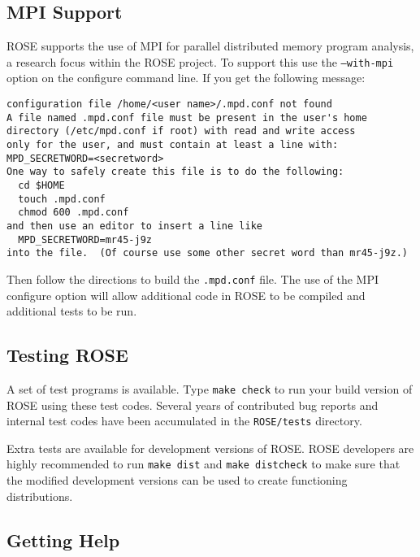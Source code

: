 
\subsection{MPI Support}
     ROSE supports the use of MPI for parallel distributed memory program analysis, a
research focus within the ROSE project.  To support this use the {\tt --with-mpi}
option on the configure command line.  If you get the following message:
\begin{verbatim}
configuration file /home/<user name>/.mpd.conf not found
A file named .mpd.conf file must be present in the user's home
directory (/etc/mpd.conf if root) with read and write access
only for the user, and must contain at least a line with:
MPD_SECRETWORD=<secretword>
One way to safely create this file is to do the following:
  cd $HOME
  touch .mpd.conf
  chmod 600 .mpd.conf
and then use an editor to insert a line like
  MPD_SECRETWORD=mr45-j9z
into the file.  (Of course use some other secret word than mr45-j9z.)
\end{verbatim}
Then follow the directions to build the {\tt .mpd.conf} file.  The use of the 
MPI configure option will allow additional code in ROSE to be compiled and 
additional tests to be run.


\subsection{Testing ROSE}
     A set of test programs is available.  %
Type {\tt make check} to run your build version of ROSE using these test codes.  
Several years of contributed bug reports and internal test codes have been accumulated 
in the {\tt ROSE/tests} directory.

Extra tests are available for development versions of ROSE. ROSE developers
are highly recommended to run {\tt make dist} and {\tt make distcheck} to make
sure that the modified development versions can be used to create functioning
distributions.

\subsection{Getting Help}

